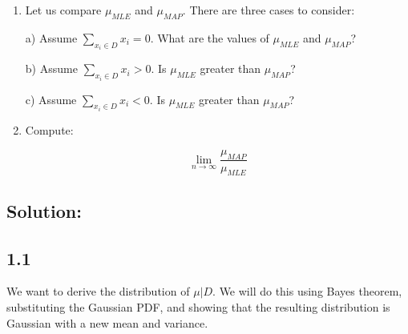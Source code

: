 \documentclass[submit]{harvardml}
\begin{document}
\begin{problem}
\begin{enumerate}
\item Let us compare $\mu_{MLE}$  and $\mu_{MAP}$. There are three cases to consider:

 a) Assume $\sum_{x_i \in D} x_i=0$. What are the values of $\mu_{MLE}$ and $\mu_{MAP}$?

 b) Assume $\sum_{x_i \in D} x_i>0$. Is $\mu_{MLE}$ greater than $\mu_{MAP}$?

 c) Assume $\sum_{x_i \in D} x_i<0$. Is $\mu_{MLE}$ greater than $\mu_{MAP}$?
  
    
\item Compute:

$$\lim_{n \rightarrow \infty} \frac{\mu_{MAP}}{\mu_{MLE}}$$

  \end{enumerate}

  \end{problem}
  

\newpage
\subsection*{Solution:}

\subsection*{1.1}
We want to derive the distribution of $\mu|D$. We will do this using Bayes theorem, substituting the Gaussian PDF, and showing that the resulting distribution is Gaussian with a new mean and variance.
\end{document}
